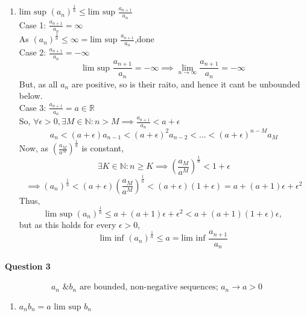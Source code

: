 \documentclass[20pt]{extarticle} %
\begin{document}
\begin{enumerate}[label=\Roman*]
	\item $\text{lim sup }(a_n)^\frac{1}{n} \leq \text{lim sup }\frac{a_{n+1}}{a_n}$\\
		Case 1:  $ \frac{a_{n+1}}{a_n}=\infty $\\
		As $(a_n)^ \frac{1}{n} \leq \infty = \text{lim sup }\frac{a_{n+1}}{a_n}$,done\\

		Case 2:  $ \frac{a_{n+1}}{a_n}= -\infty $\\
		\[ \text{lim sup }  \frac{a_{n+1}}{a_n}= -\infty \implies \lim_{n \to \infty} \frac{a_{n+1}}{a_n} = -\infty\]
		But, as all $a_n$ are positive, so is their raito, and hence it cant be unbounded below. \\

		Case 3:  $ \frac{a_{n+1}}{a_n}= a \in \mathbb{R} $\\
		So, $ \forall \epsilon > 0,  \exists M \in \mathbb{N}: n > M \implies \frac{a_{n+1}}{a_n} < a+\epsilon$
		\[ a_n<(a+\epsilon) a_{n-1}<(a+\epsilon)^2 a_{n-2}<...<(a+\epsilon)^{n-M} a_M \]
		Now, as $(\frac{a_M}{a^M})^{ \frac{1}{n} }$ is constant,
		\[   	\exists K \in \mathbb{N}: n \geq K \implies  (\frac{a_M}{a^M})^{ \frac{1}{n} } <1+\epsilon\]
		\[ \implies (a_n)^ \frac{1}{n}<(a+ \epsilon) (\frac{a_M}{a^M})^{ \frac{1}{n} } < (a+\epsilon)(1+\epsilon)=a+(a+1)\epsilon + \epsilon^2 \]
		Thus,
		\[\text{lim sup }(a_n)^ \frac{1}{n} \leq a+(a+1) \epsilon + \epsilon^2<a+(a+1)(1+\epsilon)\epsilon, \]
	but as this holds for every $\epsilon>0$,
		\[ \text{lim inf }(a_n)^ \frac{1}{n} \leq a= \text{lim inf } \frac{a_{n+1}}{a_n}  \]

\end{enumerate}

\paragraph{Question 3}
\[\text{ $a_n$ \& $b_n$ are bounded, non-negative sequences; $a_n \rightarrow a >0 $   } \]
\begin{enumerate}[label=\Roman*]
	\item {}$a_n b_n = a \text{ lim sup }b_n$

\end{enumerate}
\end{document}
